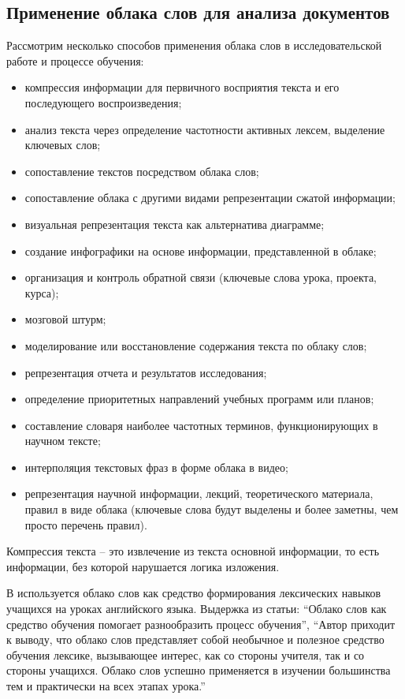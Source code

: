 \documentclass[bachelor, och, coursework ]{SCWorks}
\begin{document}
\subsection{Применение облака слов для анализа документов}
Рассмотрим несколько способов применения облака слов в исследовательской работе и процессе обучения\cite{1}:
\begin{itemize} 
    \item компрессия информации для первичного восприятия текста и его последующего воспроизведения; 
    \item анализ текста через определение частотности активных лексем, выделение ключевых слов;
    \item сопоставление текстов посредством облака слов;
    \item сопоставление облака с другими видами репрезентации сжатой информации; 
    \item визуальная репрезентация текста как альтернатива диаграмме;
    \item создание инфографики на основе информации, представленной в облаке; 
    \item организация и контроль обратной связи (ключевые слова урока, проекта, курса); 
    \item мозговой штурм; 
    \item моделирование или восстановление содержания текста по облаку слов;
    \item репрезентация отчета и результатов исследования;
    \item определение приоритетных направлений учебных программ или планов;
    \item составление словаря наиболее частотных терминов, функционирующих в научном тексте; 
    \item интерполяция текстовых фраз в форме облака в видео; 
    \item репрезентация научной информации, лекций, теоретического материала, правил в виде облака (ключевые слова будут выделены и более заметны, чем просто перечень правил).
\end{itemize}
Компрессия текста – это извлечение из текста основной информации, то есть информации, без которой нарушается логика изложения.


В \cite{2} используется облако слов как средство формирования лексических навыков учащихся на уроках английского языка. Выдержка из статьи: “Облако слов как средство обучения помогает разнообразить процесс обучения”, “Автор приходит к выводу, что облако слов представляет собой необычное и полезное средство обучения лексике, вызывающее интерес, как со стороны учителя, так и со стороны учащихся. Облако слов успешно применяется в изучении большинства тем и практически на всех этапах урока.” 
\end{document}
